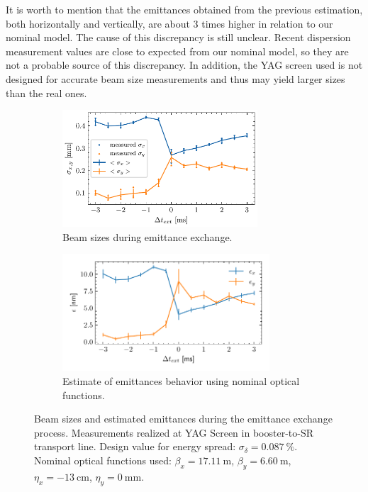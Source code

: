 \documentclass[a4paper,
               keeplastbox,   %
              nospread,     %
               ]{jacow}
\begin{document}
It is worth to mention that the emittances obtained from the previous estimation, both horizontally and vertically, are about 3 times higher in relation to our nominal model. The cause of this discrepancy is still unclear. Recent dispersion measurement values are close to expected from our nominal model, so they are not a probable source of this discrepancy. In addition, the YAG screen used is not designed for accurate beam size measurements and thus may yield larger sizes than the real ones.
\begin{figure}[ht]
\centering
\begin{subfigure}[c]{0.45\textwidth}
         \centering
         \includegraphics[trim={0.2cm 0.2cm 0 0}, clip, width=0.8\textwidth]{THPOPT056_f5a.pdf}
         \caption{Beam sizes during emittance exchange.}
         \label{subfig:emit_exc_beamsizes}
\end{subfigure}
\hfill
\begin{subfigure}[c]{0.45\textwidth}
        \centering
        \includegraphics[trim={0.4cm 0.4cm 0 0}, clip, width=0.85\textwidth]{THPOPT056_f5b.pdf}
         \caption{Estimate of emittances behavior using nominal optical functions.}
         \label{subfig:emit_exc_emittances}
     \end{subfigure}
        \caption{Beam sizes and estimated emittances during the emittance exchange process. Measurements realized at YAG Screen in booster-to-SR transport line.  Design value for energy spread: $\sigma_{\delta} = \SI{0.087}{\%}$. Nominal optical functions used: $\beta_x = \SI{17.11}{\meter}$, $\beta_y = \SI{6.60}{\meter}$, $\eta_x = \SI{-13}{\centi \meter}$, $\eta_y = \SI{0}{\milli \meter}$.}
        \label{fig:vary_ext_times}
\end{figure}
\end{document}
